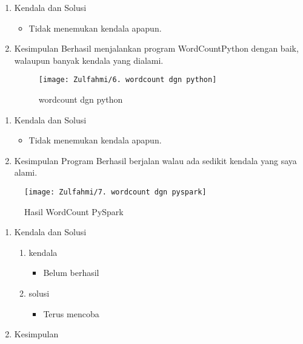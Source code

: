 \clearpage
{}
\begin{enumerate}
\item Kendala dan Solusi

\begin{itemize}
    \item Tidak menemukan kendala apapun.
\end{itemize}
    

\item Kesimpulan
\newline Berhasil menjalankan program WordCountPython dengan baik, walaupun banyak kendala yang dialami.


\begin{figure}[!ht]
    \texttt{[image: Zulfahmi/6. wordcount dgn python]}
    \caption{wordcount dgn python}
    \label{gam:hasil WordCountPython}
    \end{figure}

\end{enumerate}

\clearpage
{}
\begin{enumerate}
\item Kendala dan Solusi

\begin{itemize}
    \item Tidak menemukan kendala apapun.
\end{itemize}

\item Kesimpulan
\newline Program Berhasil berjalan walau ada sedikit kendala yang saya alami.

\end{enumerate}

\begin{figure}[!ht]
    \texttt{[image: Zulfahmi/7. wordcount dgn pyspark]}
    \caption{Hasil WordCount PySpark }
    \label{gam:hasil WordCountPyspark}
\end{figure}

\clearpage
{}
\begin{enumerate}
\item Kendala dan Solusi

\begin{enumerate}
    \item kendala
\begin{itemize}
    \item Belum berhasil
\end{itemize}
    \item solusi
\begin{itemize}
    \item Terus mencoba
\end{itemize}
\end{enumerate}

\item Kesimpulan
\newline 

\end{enumerate}